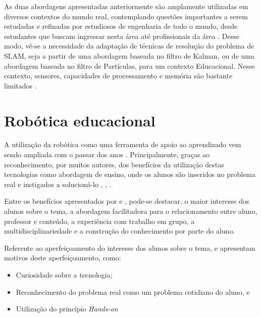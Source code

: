 As duas abordagens apresentadas anteriormente são amplamente utilizadas em diversos contextos do mundo real, contemplando questões importantes a serem estudadas e refinadas por estudiosos de engenharia de todo o mundo, desde estudantes que buscam ingressar nesta área até profissionais da área \cite{simpleRobotsIntroductionEng}. Desse modo, vê-se a necessidade da adaptação de técnicas de resolução do problema de SLAM, seja a partir de uma abordagem baseada no filtro de Kalman, ou de uma abordagem baseada no filtro de Partículas, para um contexto Educacional. Nesse contexto, sensores, capacidades de processamento e memória são bastante limitados \cite{roboticEducationBasedLego}.

\section{Robótica educacional} %
\label{sec:robótica_educacional}

A utilização da robótica como uma ferramenta de apoio ao aprendizado vem sendo ampliada com o passar dos anos \cite{teachingWithRoboticKit}. Principalmente, graças ao reconhecimento, por muitos autores, dos benefícios da utilização destas tecnologias como abordagem de ensino, onde os alunos são inseridos no problema real e instigados a solucioná-lo \cite{teachingWithRoboticKit}, \cite{construcionismoPapert}, \cite{roboticaEducativaEnsinoMedio}.

Entre os benefícios apresentados por \cite{daMaquinaDeEnsinarAMaquinaDeAprender} e \cite{PCsEConstrucionismo}, pode-se destacar, o maior interesse dos alunos sobre o tema, a abordagem facilitadora para o relacionamento entre aluno, professor e conteúdo, a experiência com trabalho em grupo, a multidisciplinariedade e a construção do conhecimento por parte do aluno.

Referente ao aperfeiçoamento do interesse dos alunos sobre o tema, \cite{construcionismoPapert} e \cite{teachingWithRoboticKit} apresentam motivos deste aperfeiçoamento, como:
\begin{itemize}
	\item Curiosidade sobre a tecnologia;

	\item Reconhecimento do problema real como um problema cotidiano do aluno, e

	\item Utilização do princípio \textit{Hands-on} \cite{PCsEConstrucionismo}
\end{itemize}

